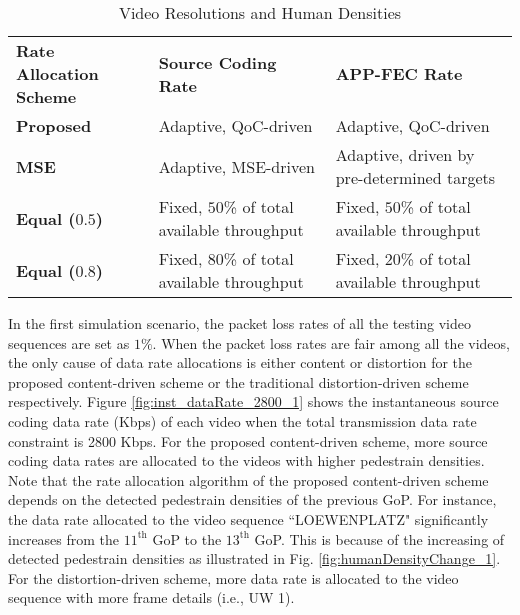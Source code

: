 \documentclass[journal]{IEEEtran}
\begin{document}
\begin{table}[t]
\renewcommand{\arraystretch}{1.3}
\caption{Video Resolutions and Human Densities}
\begin{center}
\begin{tabular}{|p{1.9cm}!{\vrule width 2pt}p{2.7cm}|p{2.7cm}|}
\hline
\textbf{Rate Allocation Scheme} & \textbf{Source Coding Rate} & \textbf{APP-FEC Rate} \\ 
\textbf{Proposed} & Adaptive, QoC-driven & Adaptive, QoC-driven \\ \hline
\textbf{MSE} & Adaptive, MSE-driven & Adaptive, driven by pre-determined targets \\ \hline 
\textbf{Equal ($0.5$)} & Fixed, $50$\% of total available throughput  & Fixed, $50$\% of total available throughput \\ \hline
\textbf{Equal ($0.8$)} &Fixed, $80$\% of total available throughput &Fixed, $20$\% of total available throughput \\
\hline
\end{tabular}
\end{center}
\label{Table: schemes}
\end{table}






In the first simulation scenario, the packet loss rates of all the testing video sequences are set as $1\%$. When the packet loss rates are fair among all the videos, the only cause of data rate allocations is either content or distortion for the proposed content-driven scheme or the traditional distortion-driven scheme respectively. Figure \ref{fig:inst_dataRate_2800_1} shows the instantaneous source coding data rate (Kbps) of each video when the total transmission data rate constraint is 2800 Kbps. For the proposed content-driven scheme, more source coding data rates are allocated to the videos with higher pedestrain densities. Note that the rate allocation algorithm of the proposed content-driven scheme depends on the detected pedestrain densities of the previous GoP. For instance, the data rate allocated to the video sequence ``LOEWENPLATZ" significantly increases from the $11^\text{th}$ GoP to the $13^\text{th}$ GoP. This is because of the increasing of detected pedestrain densities as illustrated in Fig. \ref{fig:humanDensityChange_1}. For the distortion-driven scheme, more data rate is allocated to the video sequence with more frame details (i.e., UW 1).
\end{document}
